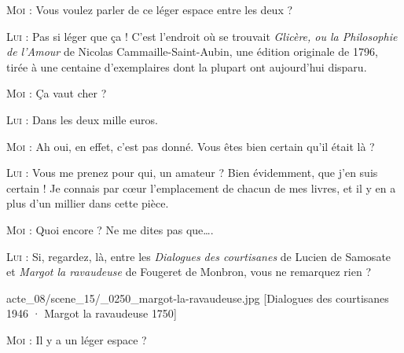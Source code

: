 \begin{dialogue}
\textsc{Moi} : Vous voulez parler de ce léger espace entre les deux ?

\textsc{Lui} : Pas si léger que ça ! C’est l’endroit où se trouvait \textit{Glicère, ou la Philosophie de l’Amour} de Nicolas Cammaille-Saint-Aubin, une édition originale de 1796, tirée à une centaine d’exemplaires dont la plupart ont aujourd’hui disparu.

\textsc{Moi} : Ça vaut cher ?

\textsc{Lui} : Dans les deux mille euros.

\textsc{Moi} : Ah oui, en effet, c’est pas donné. Vous êtes bien certain qu’il était là ?

\textsc{Lui} : Vous me prenez pour qui, un amateur ? Bien évidemment, que j’en suis certain ! Je connais par cœur l’emplacement de chacun de mes livres, et il y en a plus d’un millier dans cette pièce. 

\textsc{Moi} : Quoi encore ? Ne me dites pas que….

\textsc{Lui} : Si, regardez, là, entre les \textit{Dialogues des courtisanes} de Lucien de Samosate et \textit{Margot la ravaudeuse} de Fougeret de Monbron, vous ne remarquez rien ?

%
%
%
{acte_08/scene_15/_0250_margot-la-ravaudeuse.jpg}%
[Dialogues des courtisanes \textup{1946} · Margot la ravaudeuse \textup{1750}]%

\textsc{Moi} : Il y a un léger espace ?


\end{dialogue}
